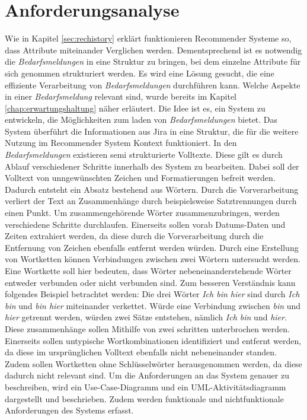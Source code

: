 \section{Anforderungsanalyse}
\label{sec:anforderungsanalyse}
Wie in Kapitel \ref{sec:rechistory} erklärt funktionieren Recommender Systeme so, dass Attribute miteinander Verglichen werden. Dementsprechend ist es notwendig die \emph{Bedarfsmeldungen} in eine Struktur zu bringen, bei dem einzelne Attribute für sich genommen strukturiert werden. Es wird eine Lösung gesucht, die eine effiziente Verarbeitung von \emph{Bedarfsmeldungen} durchführen kann. Welche Aspekte in einer \emph{Bedarfsmeldung} relevant sind, wurde bereits im Kapitel \ref{chap:erwartungshaltung} näher erläutert. Die Idee ist es, ein System zu entwickeln, die Möglichkeiten zum laden von \emph{Bedarfsmeldungen} bietet. Das System überführt die Informationen aus Jira in eine Struktur, die für die weitere Nutzung im Recommender System Kontext funktioniert. In den \emph{Bedarfsmeldungen} existieren semi strukturierte Volltexte. Diese gilt es durch Ablauf verschiedener Schritte innerhalb des System zu bearbeiten. Dabei soll der Volltext von unngewünschten Zeichen und Formatierungen befreit werden. Dadurch entsteht ein Absatz bestehend aus Wörtern. Durch die Vorverarbeitung verliert der Text an Zusammenhänge durch beispielsweise Satztrennungen durch einen Punkt. Um zusammengehörende Wörter zusammenzubringen, werden verschiedene Schritte durchlaufen. Einerseits sollen vorab Datums-Daten und Zeiten extrahiert werden, da diese durch die Vorverarbeitung durch die Entfernung von Zeichen ebenfalls entfernt werden würden. Durch eine Erstellung von Wortketten können Verbindungen zwischen zwei Wörtern untersucht werden. Eine Wortkette soll hier bedeuten, dass Wörter nebeneinanderstehende Wörter entweder verbunden oder nicht verbunden sind. Zum besseren Verständnis kann folgendes Beispiel betrachtet werden: Die drei Wörter \emph{Ich bin hier} sind durch \emph{Ich bin} und \emph{bin hier} miteinander verkettet. Würde eine Verbindung zwischen \emph{bin} und \emph{hier} getrennt werden, würden zwei Sätze entstehen, nämlich \emph{Ich bin} und \emph{hier}. Diese zusammenhänge sollen Mithilfe von zwei schritten unterbrochen werden. Einerseits sollen untypische Wortkombinationen identifiziert und entfernt werden, da diese im ursprünglichen Volltext ebenfalls nicht nebeneinander standen. Zudem sollen Wortketten ohne Schlüsselwörter herausgenommen werden, da diese dadurch nicht relevant sind. Um die Anforderungen an das System genauer zu beschreiben, wird ein Use-Case-Diagramm und ein UML-Aktivitätsdiagramm dargestellt und beschrieben. Zudem werden funktionale und nichtfunktionale Anforderungen des Systems erfasst.
